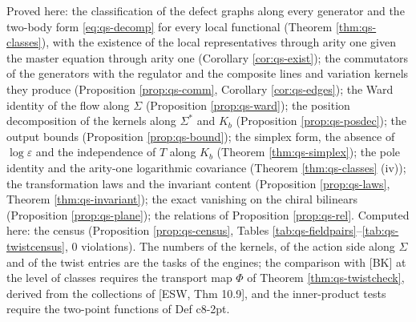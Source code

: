 Proved here: the classification of the defect graphs along every generator and the two-body form \eqref{eq:qs-decomp} for every local functional (Theorem \ref{thm:qs-classes}), with the existence of the local representatives through arity one given the master equation through arity one (Corollary \ref{cor:qs-exist}); the commutators of the generators with the regulator and the composite lines and variation kernels they produce (Proposition \ref{prop:qs-comm}, Corollary \ref{cor:qs-edges}); the Ward identity of the flow along $\Sigma$ (Proposition \ref{prop:qs-ward}); the position decomposition of the kernels along $\Sigma^*$ and $K_b$ (Proposition \ref{prop:qs-posdec}); the output bounds (Proposition \ref{prop:qs-bound}); the simplex form, the absence of $\log\varepsilon$ and the independence of $T$ along $K_b$ (Theorem \ref{thm:qs-simplex}); the pole identity and the arity-one logarithmic covariance (Theorem \ref{thm:qs-classes} (iv)); the transformation laws and the invariant content (Proposition \ref{prop:qs-laws}, Theorem \ref{thm:qs-invariant}); the exact vanishing on the chiral bilinears (Proposition \ref{prop:qs-plane}); the relations of Proposition \ref{prop:qs-rel}. Computed here: the census (Proposition \ref{prop:qs-census}, Tables \ref{tab:qs-fieldpairs}--\ref{tab:qs-twistcensus}, $0$ violations). The numbers of the kernels, of the action side along $\Sigma$ and of the twist entries are the tasks of the engines; the comparison with [BK] at the level of classes requires the transport map $\Phi$ of Theorem \ref{thm:qs-twistcheck}, derived from the collections of [ESW, Thm 10.9], and the inner-product tests require the two-point functions of Def c8-2pt.


